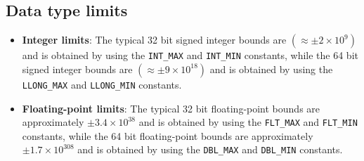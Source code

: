 \subsection{Data type limits}

\begin{itemize}
    \item \textbf{Integer limits}: The typical 32 bit signed integer bounds are $(\approx \pm 2 \times 10^9)$ and is obtained by using the \texttt{INT\_MAX} and \texttt{INT\_MIN} constants, while the 64 bit signed integer bounds are $(\approx \pm 9 \times 10^{18})$ and is obtained by using the \texttt{LLONG\_MAX} and \texttt{LLONG\_MIN} constants.
    \item \textbf{Floating-point limits}: The typical 32 bit floating-point bounds are approximately $\pm 3.4 \times 10^{38}$ and is obtained by using the \texttt{FLT\_MAX} and \texttt{FLT\_MIN} constants, while the 64 bit floating-point bounds are approximately $\pm 1.7 \times 10^{308}$ and is obtained by using the \texttt{DBL\_MAX} and \texttt{DBL\_MIN} constants.
\end{itemize}